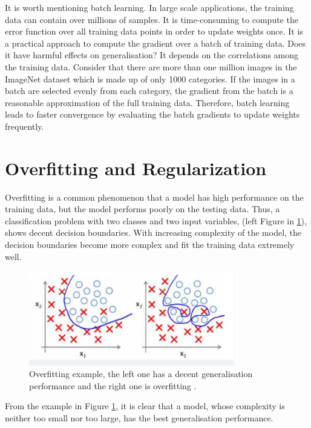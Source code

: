 It is worth mentioning batch learning. In large scale applications, the training data can contain over millions of samples. It is time-consuming to compute the error function over all training data points in order to update weights once. It is a practical approach to compute the gradient over a batch of training data. Does it have harmful effects on generalisation? It depends on the correlations among the training data. Consider that there are more than one million images in the ImageNet dataset which is made up of only 1000 categories. If the images in a batch are selected evenly from each category, the gradient from the batch is a reasonable approximation of the full training data. Therefore, batch learning leads to faster convergence by evaluating the batch gradients to update weights frequently.

\section{Overfitting and Regularization}

Overfitting is a common phenomenon that a model has high performance on the training data, but the model performs poorly on the testing data. Thus, a classification problem with two classes and two input variables, (left Figure in \ref{fig:OverfittingExample}), shows decent decision boundaries. With increasing complexity of the model, the decision boundaries become more complex and fit the training data extremely well.
\graphicspath{ {./Figures/} }
\begin{figure}[!htb]
\centering
\includegraphics[width=0.8\textwidth]{overfitting.png}
\caption{\label{fig:OverfittingExample}Overfitting example, the left one has a decent generalisation performance and the right one is overfitting \citep{OverfittingFigure}.}
\end{figure}
From the example in Figure \ref{fig:OverfittingExample}, it is clear that a model, whose complexity is neither too small nor too large, has the best generalisation performance. 

